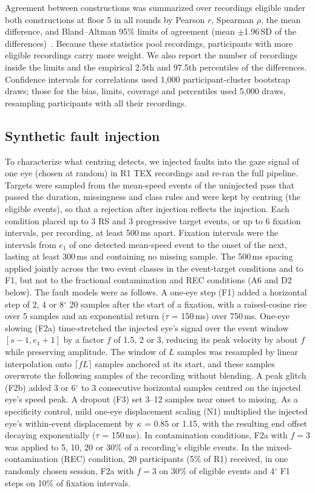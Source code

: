 Agreement between constructions was summarized over recordings eligible under both constructions at floor 5 in all rounds by Pearson $r$, Spearman $\rho$, the mean difference, and Bland--Altman 95\% limits of agreement (mean $\pm$1.96\,SD of the differences)~\citep{bland1986}. Because these statistics pool recordings, participants with more eligible recordings carry more weight. We also report the number of recordings inside the limits and the empirical 2.5th and 97.5th percentiles of the differences. Confidence intervals for correlations used 1,000 participant-cluster bootstrap draws; those for the bias, limits, coverage and percentiles used 5,000 draws, resampling participants with all their recordings.

\subsection{Synthetic fault injection}

To characterize what centring detects, we injected faults into the gaze signal of one eye (chosen at random) in R1 TEX recordings and re-ran the full pipeline. Targets were sampled from the mean-speed events of the uninjected pass that passed the duration, missingness and class rules and were kept by centring (the eligible events), so that a rejection after injection reflects the injection. Each condition placed up to 3 RS and 3 progressive target events, or up to 6 fixation intervals, per recording, at least 500\,ms apart. Fixation intervals were the intervals from $e_1$ of one detected mean-speed event to the onset of the next, lasting at least 300\,ms and containing no missing sample. The 500\,ms spacing applied jointly across the two event classes in the event-target conditions and to F1, but not to the fractional contamination and REC conditions (A6 and D2 below). The fault models were as follows. A one-eye step (F1) added a horizontal step of 2, 4 or 8$^\circ$ 20 samples after the start of a fixation, with a raised-cosine rise over 5 samples and an exponential return ($\tau$ = 150\,ms) over 750\,ms. One-eye slowing (F2a) time-stretched the injected eye's signal over the event window $[s-1, e_1+1]$ by a factor $f$ of 1.5, 2 or 3, reducing its peak velocity by about $f$ while preserving amplitude. The window of $L$ samples was resampled by linear interpolation onto $\lceil fL \rceil$ samples anchored at its start, and these samples overwrote the following samples of the recording without blending. A peak glitch (F2b) added 3 or 6$^\circ$ to 3 consecutive horizontal samples centred on the injected eye's speed peak. A dropout (F3) set 3--12 samples near onset to missing. As a specificity control, mild one-eye displacement scaling (N1) multiplied the injected eye's within-event displacement by $\kappa$ = 0.85 or 1.15, with the resulting end offset decaying exponentially ($\tau$ = 150\,ms). In contamination conditions, F2a with $f = 3$ was applied to 5, 10, 20 or 30\% of a recording's eligible events. In the mixed-contamination (REC) condition, 20 participants (5\% of R1) received, in one randomly chosen session, F2a with $f = 3$ on 30\% of eligible events and 4$^\circ$ F1 steps on 10\% of fixation intervals.

